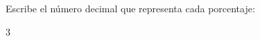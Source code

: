 Escribe el número decimal que representa cada porcentaje:

      \begin{multicols}{3}
      \end{multicols}